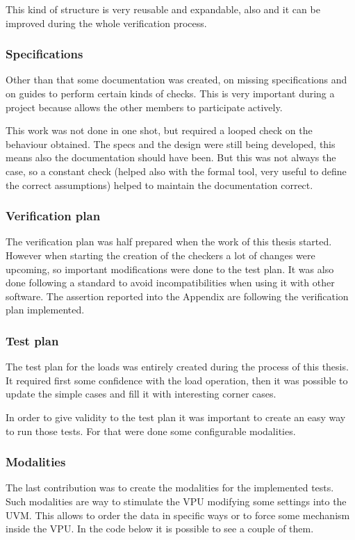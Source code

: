 This kind of structure is very reusable and expandable, also and it can be improved during the whole verification process.

\subsubsection{Specifications}
Other than that some documentation was created, on missing specifications and on guides to perform certain kinds of checks. This is very important during a project because allows the other members to participate actively.

This work was not done in one shot, but required a looped check on the behaviour obtained. The specs and the design were still being developed, this means also the documentation should have been. But this was not always the case, so a constant check (helped also with the formal tool, very useful to define the correct assumptions) helped to maintain the documentation correct.

\subsubsection{Verification plan}
The verification plan was half prepared when the work of this thesis started. However when starting the creation of the checkers a lot of changes were upcoming, so important modifications were done to the test plan. It was also done following a standard to avoid incompatibilities when using it with other software.
The assertion reported into the Appendix are following the verification plan implemented.

\subsubsection{Test plan}
The test plan for the loads was entirely created during the process of this thesis. It required first some confidence with the load operation, then it was possible to update the simple cases and fill it with interesting corner cases.

In order to give validity to the test plan it was important to create an easy way to run those tests. For that were done some configurable modalities.


\subsubsection{Modalities}
The last contribution was to create the modalities for the implemented tests. Such modalities are way to stimulate the VPU modifying some settings into the UVM. This allows to order the data in specific ways or to force some mechanism inside the VPU. In the code below it is possible to see a couple of them.

